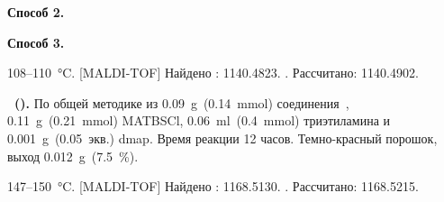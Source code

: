\textbf{Способ 2.}~

\textbf{Способ 3.}~
\begin{experimental}
     108--\SI{110}{\celsius}.
    [MALDI-TOF] Найдено \ce{[M + H]+}: \num{1140.4823}. . Рассчитано: \ce{[M + H]} \num{1140.4902}.
\end{experimental}

\textbf{~().} 
По общей методике из \SI{0.09}{\gram}~(\SI{0.14}{\milli\mole}) соединения~, \SI{0.11}{\gram}~(\SI{0.21}{\milli\mole}) MATBSCl, \SI{0.06}{\milli\litre}~(\SI{0.4}{\milli\mole}) триэтиламина и \SI{0.001}{\gram}~(0.05~экв.) \ac{dmap}.
Время реакции 12 часов.
Темно-красный порошок, выход \SI{0.012}{\gram}~(\SI{7.5}{\percent}).
\begin{experimental}
     147--\SI{150}{\celsius}.
    [MALDI-TOF] Найдено \ce{[M + H]+}: \num{1168.5130}. . Рассчитано: \ce{[M + H]} \num{1168.5215}.
\end{experimental}
